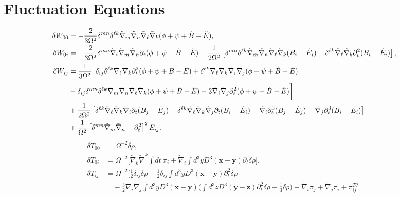 \documentclass[10pt,letterpaper]{article}
\begin{document}
\section*{Fluctuation Equations}
\begin{align}
\delta W_{00}  &= -\frac{2}{3\Omega^2} \delta^{mn}\delta^{\ell k}\tilde{\nabla}_m\tilde{\nabla}_n\tilde{\nabla}_{\ell}\tilde{\nabla}_k (\phi + \psi +\dot{B}-\ddot{E}),
\nonumber\\	
\delta W_{0i} &=  -\frac{2}{3\Omega^2} \delta^{mn}\tilde{\nabla}_i\tilde{\nabla}_m\tilde{\nabla}_n\partial_t(\phi +\psi +\dot{B}-\ddot{E})
	+\frac{1}{2\Omega^2}\left[\delta^{mn}\delta^{\ell k}\tilde{\nabla}_m\tilde{\nabla}_n\tilde{\nabla}_{\ell}\tilde{\nabla}_k(B_i - \dot{E}_i) -  \delta^{\ell k}\tilde{\nabla}_{\ell}\tilde{\nabla}_k \partial_t^2(B_i - \dot{E}_i)\right],
\nonumber\\	
\delta W_{ij}  &= \frac{1}{3\Omega^2}\bigg{[} \delta_{ij}\delta^{\ell k}\tilde{\nabla}_{\ell}\tilde{\nabla}_k  \partial_t^2(\phi+ \psi+\dot{B}-\ddot{E}) + \delta^{\ell k}\tilde{\nabla}_{\ell}\tilde{\nabla}_k \tilde{\nabla}_i\tilde{\nabla}_j (\phi + \psi +\dot{B}-\ddot{E}) 
\nonumber\\
&- \delta_{ij} \delta^{mn}\delta^{\ell k}\tilde{\nabla}_m\tilde{\nabla}_n\tilde{\nabla}_{\ell}\tilde{\nabla}_k(\phi + \psi +\dot{B}-\ddot{E}) -3\tilde{\nabla}_i\tilde{\nabla}_j \partial_t^2(\phi + \psi +\dot{B}-\ddot{E})\bigg{] }
\nonumber\\
&+\frac{1}{2\Omega^2}\left[ \delta^{\ell k}\tilde{\nabla}_{\ell}\tilde{\nabla}_k \tilde{\nabla}_i   \partial_t(B_j - \dot{E}_j)+ \delta^{\ell k}\tilde{\nabla}_{\ell}\tilde{\nabla}_k \tilde{\nabla}_j \partial_t(B_i - \dot{E}_i) - \tilde{\nabla}_i\partial_t^3(B_j - \dot{E}_j)-\tilde{\nabla}_j\partial_t^3(B_i - \dot{E}_i)\right]
\nonumber\\
&+\frac{1}{\Omega^2}\left[\delta^{mn}\tilde{\nabla}_m\tilde{\nabla}_n-\partial_t^2\right]^2E_{ij}.
\label{AP75}
\end{align}
\begin{align}
\delta T_{00}  &= \Omega^{-2} \delta \rho,
\nonumber\\	
\delta T_{0i} &= \Omega^{-2} \bigg[ \tilde\nabla_k \tilde\nabla^k \int dt\  \pi_i  + \tilde\nabla_i  \int d^3y D^3(\mathbf x-\mathbf y) \partial_t \delta \rho\bigg],
\nonumber\\	
\delta T_{ij}  &= \Omega^{-2}\bigg[ 
\frac12 \delta_{ij} \delta\rho + \frac12 \delta_{ij} \int d^3y D^3(\mathbf x-\mathbf y) \partial_t^2 \delta \rho \nonumber\\
&\quad -\frac32 \tilde\nabla_i\tilde\nabla_j \int d^3y D^3(\mathbf x-\mathbf y) \bigg( \int d^3z D^3(\mathbf y-\mathbf z) \partial_t^2 \delta \rho + \frac13\delta\rho\bigg)
+ \tilde\nabla_i \pi_j + \tilde\nabla_j \pi_i + \pi_{ij}^{T\theta}\bigg].
\end{align}
\end{document}
